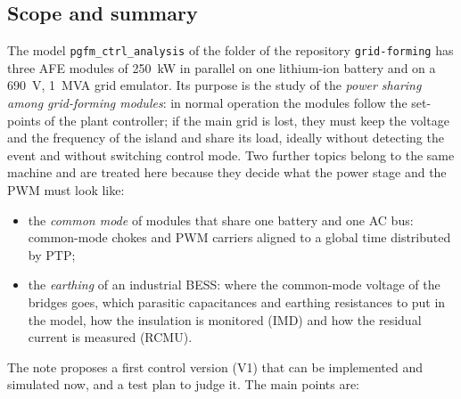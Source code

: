 \documentclass[11pt,a4paper]{scrartcl}
\newcommand{\code}[1]{\texttt{#1}}
\begin{document}
\begin{onehalfspace}
\section{Scope and summary}
\label{sec:scope}

The model \code{pgfm\_ctrl\_analysis} of the folder  of the repository \code{grid-forming} has three AFE modules of \SI{250}{\kilo\watt} in parallel on one lithium-ion battery and on a \SI{690}{V}, \SI{1}{MVA} grid emulator. Its purpose is the study of the \emph{power sharing among grid-forming modules}: in normal operation the modules follow the set-points of the plant controller; if the main grid is lost, they must keep the voltage and the frequency of the island and share its load, ideally without detecting the event and without switching control mode. Two further topics belong to the same machine and are treated here because they decide what the power stage and the PWM must look like:

\begin{itemize}[nosep]
	\item the \emph{common mode} of modules that share one battery and one AC bus: common-mode chokes and PWM carriers aligned to a global time distributed by PTP;
	\item the \emph{earthing} of an industrial BESS: where the common-mode voltage of the bridges goes, which parasitic capacitances and earthing resistances to put in the model, how the insulation is monitored (IMD) and how the residual current is measured (RCMU).
\end{itemize}

The note proposes a first control version (V1) that can be implemented and simulated now, and a test plan to judge it. The main points are:


\end{onehalfspace}
\end{document}
